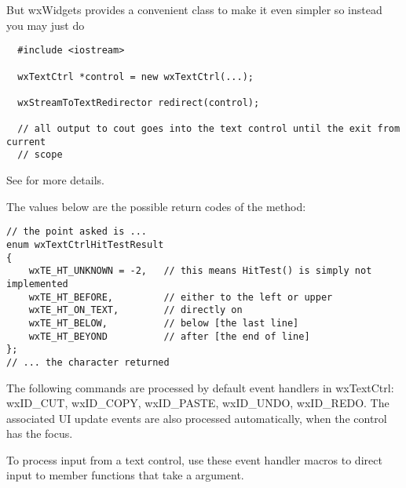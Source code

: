 But wxWidgets provides a convenient class to make it even simpler so instead
you may just do

{\small%
\begin{verbatim}
  #include <iostream>

  wxTextCtrl *control = new wxTextCtrl(...);

  wxStreamToTextRedirector redirect(control);

  // all output to cout goes into the text control until the exit from current
  // scope
\end{verbatim}
}%

See  for more
details.


The values below are the possible return codes of the  method:

{\small
\begin{verbatim}
// the point asked is ...
enum wxTextCtrlHitTestResult
{
    wxTE_HT_UNKNOWN = -2,   // this means HitTest() is simply not implemented
    wxTE_HT_BEFORE,         // either to the left or upper
    wxTE_HT_ON_TEXT,        // directly on
    wxTE_HT_BELOW,          // below [the last line]
    wxTE_HT_BEYOND          // after [the end of line]
};
// ... the character returned
\end{verbatim}
}


The following commands are processed by default event handlers in wxTextCtrl: wxID\_CUT, wxID\_COPY,
wxID\_PASTE, wxID\_UNDO, wxID\_REDO. The associated UI update events are also processed
automatically, when the control has the focus.

To process input from a text control, use these event handler macros to direct input to member
functions that take a  argument.

\twocolwidtha{7cm}%
\begin{twocollist}\itemsep=0pt
\end{twocollist}%

